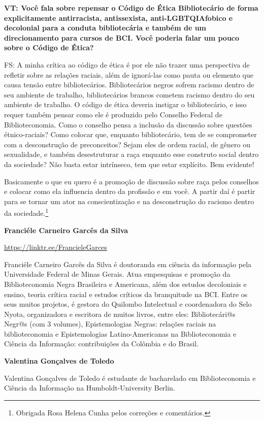 \documentclass[a4paper,
fontsize=11pt,
oneside,
numbers=noperiodatend,
parskip=half-,
bibliography=totoc,
final
]{scrartcl}
\begin{document}
\textbf{VT: Você fala sobre repensar o Código de Ética Bibliotecário de
forma explicitamente antirracista, antissexista, anti-LGBTQIAfobico e
decolonial para a conduta bibliotecária e também de um direcionamento
para cursos de BCI. Você poderia falar um pouco sobre o Código de
Ética?}

FS: A minha crítica ao código de ética é por ele não trazer uma
perspectiva de refletir sobre as relações raciais, além de ignorá-las
como pauta ou elemento que causa tensão entre bibliotecários.
Bibliotecários negros sofrem racismo dentro de seu ambiente de trabalho,
bibliotecários brancos cometem racismo dentro do seu ambiente de
trabalho. O código de ética deveria instigar o bibliotecário, e isso
requer também pensar como ele é produzido pelo Conselho Federal de
Biblioteconomia. Como o conselho pensa a inclusão da discussão sobre
questões étnico-raciais? Como colocar que, enquanto bibliotecário, tem
de se comprometer com a desconstrução de preconceitos? Sejam eles de
ordem racial, de gênero ou sexualidade, e também desestruturar a raça
enquanto esse construto social dentro da sociedade? Não basta estar
intrínseco, tem que estar explícito. Bem evidente!

Basicamente o que eu quero é a promoção de discussão sobre raça pelos
conselhos e colocar como ela influencia dentro da profissão e em você. A
partir daí é partir para se tornar um ator na conscientização e na
desconstrução do racismo dentro da sociedade.\footnote{Obrigada Rosa
  Helena Cunha pelos correções e comentários.}

\textbf{Franciéle Carneiro Garcês da Silva}

\url{https://linktr.ee/FrancieleGarces}

Franciéle Carneiro Garcês da Silva é doutoranda em ciência da informação
pela Universidade Federal de Minas Gerais. Atua empesquisas e promoção
da Biblioteconomia Negra Brasileira e Americana, além dos estudos
decoloniais e ensino, teoria crítica racial e estudos críticos da
branquitude na BCI. Entre os seus muitos projetos, é gestora do Quilombo
Intelectual e coordenadora do Selo Nyota, organizadora e escritora de
muitos livros, entre eles: Bibliotecári@s Negr@s (com 3 volumes),
Epistemologias Negras: relações raciais na biblioteconomia e
Epistemologias Latino-Americanas na Biblioteconomia e Ciência da
Informação: contribuições da Colômbia e do Brasil.

\textbf{Valentina Gonçalves de Toledo}

Valentina Gonçalves de Toledo é estudante de bacharelado em
Biblioteconomia e Ciência da Informação na Humboldt-University Berlin.

\end{document}
